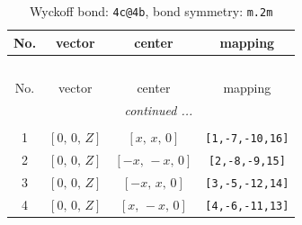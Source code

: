 \documentclass[fleqn,8pt]{jsarticle}
\begin{document}
\renewcommand{\arraystretch}{1.2}
\begin{longtable}{cccc}
\caption{Wyckoff bond: {\tt 4c@4b}, bond symmetry: {\tt m.2m}}
 \\
 \hline \hline
No. & vector & center & mapping \\ \hline \endfirsthead

\multicolumn{3}{l}{\tablename\ \thetable{}} \\
 \hline \hline
No. & vector & center & mapping \\ \hline \endhead

 \hline \hline
\multicolumn{3}{r}{\footnotesize\it continued ...} \\ \endfoot

 \hline \hline
\multicolumn{3}{r}{} \\ \endlastfoot

1 & $\left[ 0,\, 0,\, Z \right]$ & $\left[ x,\, x,\, 0 \right]$ & {\tt [1,-7,-10,16]} \\ \hline
2 & $\left[ 0,\, 0,\, Z \right]$ & $\left[ - x,\, - x,\, 0 \right]$ & {\tt [2,-8,-9,15]} \\ \hline
3 & $\left[ 0,\, 0,\, Z \right]$ & $\left[ - x,\, x,\, 0 \right]$ & {\tt [3,-5,-12,14]} \\ \hline
4 & $\left[ 0,\, 0,\, Z \right]$ & $\left[ x,\, - x,\, 0 \right]$ & {\tt [4,-6,-11,13]} \\
\end{longtable}
\renewcommand{\arraystretch}{1.2}
\end{document}
